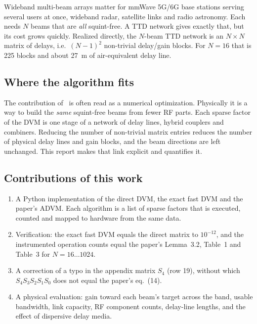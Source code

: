 \documentclass[conference]{IEEEtran}
\begin{document}
Wideband multi-beam arrays matter for mmWave 5G/6G base stations serving several users at once, wideband radar, satellite links and radio astronomy. Each needs $N$ beams that are \emph{all} squint-free. A TTD network gives exactly that, but its cost grows quickly. Realized directly, the $N$-beam TTD network is an $N\times N$ matrix of delays, i.e.\ $(N-1)^2$ non-trivial delay/gain blocks. For $N=16$ that is 225 blocks and about 27~m of air-equivalent delay line.

\subsection{Where the algorithm fits}
The contribution of~\cite{perera2025} is often read as a numerical optimization. Physically it is a way to build the \emph{same} squint-free beams from fewer RF parts. Each sparse factor of the DVM is one stage of a network of delay lines, hybrid couplers and combiners. Reducing the number of non-trivial matrix entries reduces the number of physical delay lines and gain blocks, and the beam directions are left unchanged. This report makes that link explicit and quantifies it.

\subsection{Contributions of this work}
\begin{enumerate}
\item A Python implementation of the direct DVM, the exact fast DVM and the paper's ADVM. Each algorithm is a list of sparse factors that is executed, counted and mapped to hardware from the same data.
\item Verification: the exact fast DVM equals the direct matrix to $10^{-12}$, and the instrumented operation counts equal the paper's Lemma~3.2, Table~1 and Table~3 for $N=16\ldots1024$.
\item A correction of a typo in the appendix matrix $S_4$ (row 19), without which $S_4S_3S_2S_1S_0$ does not equal the paper's eq.~(14).
\item A physical evaluation: gain toward each beam's target across the band, usable bandwidth, link capacity, RF component counts, delay-line lengths, and the effect of dispersive delay media.
\end{enumerate}
\end{document}
